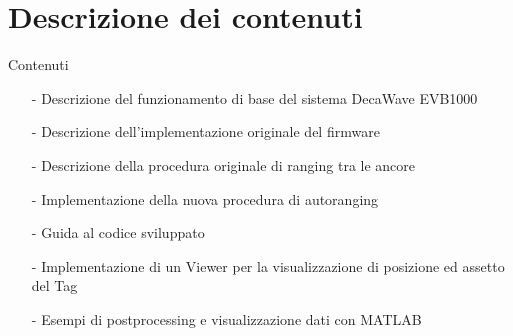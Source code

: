 \section{Descrizione dei contenuti}
\begin{frame}{Contenuti}
  \begin{itemize}
  \item [-] Descrizione del funzionamento di base del sistema DecaWave EVB1000
  \item [-] Descrizione dell'implementazione originale del firmware
  \item [-] Descrizione della procedura originale di ranging tra le ancore 
  \item [-] Implementazione della nuova procedura di autoranging
  \item [-] Guida al codice sviluppato
  \item [-] Implementazione di un Viewer per la visualizzazione di posizione ed assetto del Tag
  \item [-] Esempi di postprocessing e visualizzazione dati con MATLAB
  \end{itemize}
\end{frame}
